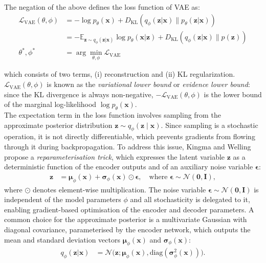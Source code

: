 \documentclass[Main.tex]{subfiles}
\begin{document}
The negation of the above defines the loss function of VAE as:
\begin{align}
\mathcal{L}_{\text{VAE}}(\theta, \phi) &= -\log p_\theta(\mathbf{x}) + D_{\text{KL}}(q_\phi(\mathbf{z}|\mathbf{x}) \| p_\theta(\mathbf{z}|\mathbf{x})) \\
&= -\mathbb{E}_{\mathbf{z} \sim q_\phi(\mathbf{z}|\mathbf{x})} \log p_\theta(\mathbf{x}|\mathbf{z}) + D_{\text{KL}}(q_\phi(\mathbf{z}|\mathbf{x}) \| p(\mathbf{z})) \\
\theta^{*}, \phi^{*} &= \arg\min_{\theta, \phi} \mathcal{L}_{\text{VAE}}
\end{align}

which consists of two terms, (i) reconstruction and (ii) KL regularization.\\

$\mathcal{L}_{\text{VAE}}(\theta, \phi)$ is known as the \textit{variational lower bound} or \textit{evidence lower bound}: since the KL divergence is always non-negative, $-\mathcal{L}_{\text{VAE}}(\theta, \phi)$ is the lower bound of the marginal log-likelihood $\log p_\theta(\mathbf{x})$.\\

The expectation term in the loss function involves sampling from the approximate posterior distribution $\mathbf{z} \sim q_\phi(\mathbf{z} \mid \mathbf{x})$. Since sampling is a stochastic operation, it is not directly differentiable, which prevents gradients from flowing through it during backpropagation. To address this issue, Kingma and Welling \cite{kingma_auto-encoding_2022} propose a \textit{reparameterisation trick}, which expresses the latent variable $\mathbf{z}$ as a deterministic function of the encoder outputs and of an auxiliary noise variable $\boldsymbol{\epsilon}$:
\begin{align}
\mathbf{z} &= \boldsymbol{\mu}_\phi(\mathbf{x}) + \boldsymbol{\sigma}_\phi(\mathbf{x}) \odot \boldsymbol{\epsilon}, 
\quad \text{where } \boldsymbol{\epsilon} \sim \mathcal{N}(\boldsymbol{0}, \mathbf{I}),
\end{align}
where $\odot$ denotes element-wise multiplication. The noise variable $\boldsymbol{\epsilon} \sim \mathcal{N}(\boldsymbol{0}, \mathbf{I})$ is independent of the model parameters $\phi$ and all stochasticity is delegated to it, enabling gradient-based optimisation of the encoder and decoder parameters. A common choice for the approximate posterior is a multivariate Gaussian with diagonal covariance, parameterised by the encoder network, which outputs the mean and standard deviation vectors $\boldsymbol{\mu}_\phi(\mathbf{x})$ and $\boldsymbol{\sigma}_\phi(\mathbf{x})$:
\begin{align}
q_\phi(\mathbf{z}|\mathbf{x}) &= \mathcal{N}\!\big(\mathbf{z}; \boldsymbol{\mu}_\phi(\mathbf{x}), \mathrm{diag}(\boldsymbol{\sigma}^2_\phi(\mathbf{x}))\big).
\end{align}
\end{document}
